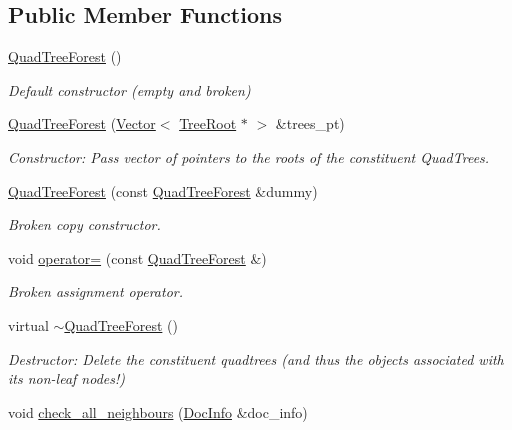 \subsection*{Public Member Functions}
\begin{DoxyCompactItemize}
\item 
\hyperlink{classoomph_1_1QuadTreeForest_a34304627e767f82740b37a44e6154e0d}{Quad\+Tree\+Forest} ()
\begin{DoxyCompactList}\small\item\em Default constructor (empty and broken) \end{DoxyCompactList}\item 
\hyperlink{classoomph_1_1QuadTreeForest_adc6e1e5e288d06b519c3eb3a3fcbdb7a}{Quad\+Tree\+Forest} (\hyperlink{classoomph_1_1Vector}{Vector}$<$ \hyperlink{classoomph_1_1TreeRoot}{Tree\+Root} $\ast$ $>$ \&trees\+\_\+pt)
\begin{DoxyCompactList}\small\item\em Constructor\+: Pass vector of pointers to the roots of the constituent Quad\+Trees. \end{DoxyCompactList}\item 
\hyperlink{classoomph_1_1QuadTreeForest_afe67a5b43ac90baac0d71dbaed0cdc49}{Quad\+Tree\+Forest} (const \hyperlink{classoomph_1_1QuadTreeForest}{Quad\+Tree\+Forest} \&dummy)
\begin{DoxyCompactList}\small\item\em Broken copy constructor. \end{DoxyCompactList}\item 
void \hyperlink{classoomph_1_1QuadTreeForest_a1769832f255924ad4805cb051bbaef9c}{operator=} (const \hyperlink{classoomph_1_1QuadTreeForest}{Quad\+Tree\+Forest} \&)
\begin{DoxyCompactList}\small\item\em Broken assignment operator. \end{DoxyCompactList}\item 
virtual \hyperlink{classoomph_1_1QuadTreeForest_ae780732924695535c5a501ea17ceb741}{$\sim$\+Quad\+Tree\+Forest} ()
\begin{DoxyCompactList}\small\item\em Destructor\+: Delete the constituent quadtrees (and thus the objects associated with its non-\/leaf nodes!) \end{DoxyCompactList}\item 
void \hyperlink{classoomph_1_1QuadTreeForest_a7ae708ced04343303be644f87cb1c169}{check\+\_\+all\+\_\+neighbours} (\hyperlink{classoomph_1_1DocInfo}{Doc\+Info} \&doc\+\_\+info)

\end{DoxyCompactItemize}
